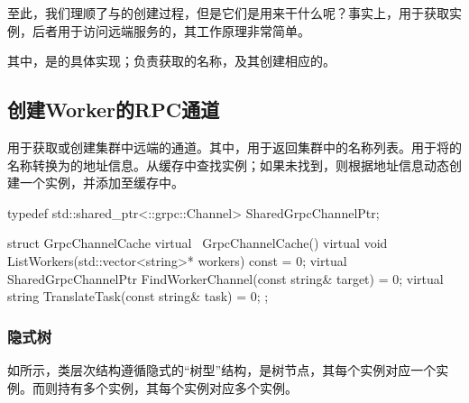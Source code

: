 \begin{content}
至此，我们理顺了与的创建过程，但是它们是用来干什么呢？事实上，用于获取实例，后者用于访问远端服务的，其工作原理非常简单。

\begin{enum}
\end{enum}

其中，是的具体实现；负责获取的名称，及其创建相应的。

\subsection{创建Worker的RPC通道}

用于获取或创建集群中远端的通道。其中，用于返回集群中的名称列表。用于将的名称转换为的地址信息。从缓存中查找实例；如果未找到，则根据地址信息动态创建一个实例，并添加至缓存中。

\begin{leftbar}
\begin{c++}
typedef std::shared_ptr<::grpc::Channel> SharedGrpcChannelPtr;

struct GrpcChannelCache {
  virtual ~GrpcChannelCache() {}
  virtual void ListWorkers(std::vector<string>* workers) const = 0;
  virtual SharedGrpcChannelPtr FindWorkerChannel(const string& target) = 0;
  virtual string TranslateTask(const string& task) = 0;
};
\end{c++}
\end{leftbar}

\subsubsection{隐式树}

如所示，类层次结构遵循隐式的“树型”结构，是树节点，其每个实例对应一个实例。而则持有多个实例，其每个实例对应多个实例。


\end{content}
